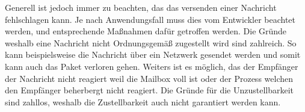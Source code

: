 Generell ist jedoch immer zu beachten, das das versenden einer Nachricht fehlschlagen kann. Je nach Anwendungsfall muss dies vom Entwickler beachtet werden, und entsprechende Maßnahmen dafür getroffen werden. Die Gründe weshalb eine Nachricht nicht Ordnungsgemäß zugestellt wird sind zahlreich. So kann beispielsweise die Nachricht über ein Netzwerk gesendet werden und somit kann auch das Paket verloren gehen. Weiters ist es möglich, das der Empfänger der Nachricht nicht reagiert weil die Mailbox voll ist oder der Prozess welchen den Empfänger beherbergt nicht reagiert. Die Gründe für die Unzustellbarkeit sind zahllos, weshalb die Zustellbarkeit auch nicht garantiert werden kann. \citep{messagedeliveryreliabilityakkadocumentation}







 